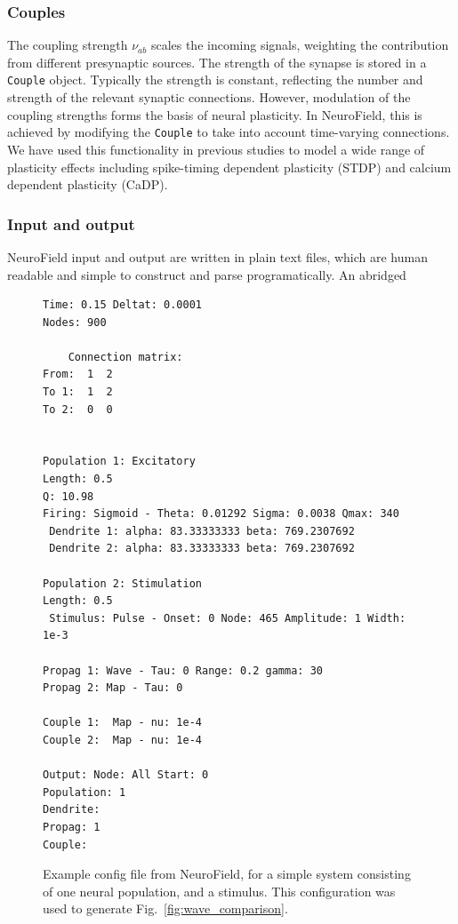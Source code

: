 \documentclass[preprint,review,10pt,authoryear,letterpaper]{elsarticle}
\begin{document}
\subsubsection{Couples}
The coupling strength $\nu_{ab}$ scales the incoming signals, weighting the contribution from different presynaptic sources. The strength of the synapse is stored in a \texttt{Couple} object. Typically the strength is constant, reflecting the number and strength of the relevant synaptic connections. However, modulation of the coupling strengths forms the basis of neural plasticity. In NeuroField, this is achieved by modifying the \texttt{Couple} to take into account time-varying connections. We have used this functionality in previous studies to model a wide range of plasticity effects including spike-timing dependent plasticity (STDP) and calcium dependent plasticity (CaDP). 


\subsubsection{Input and output}
NeuroField input and output are written in plain text files, which are human readable and simple to construct and parse programatically. An abridged 


\begin{figure}[!b]
\begin{center}
\begin{lstlisting}
Time: 0.15 Deltat: 0.0001
Nodes: 900

    Connection matrix:
From:  1  2 
To 1:  1  2  
To 2:  0  0  


Population 1: Excitatory
Length: 0.5
Q: 10.98
Firing: Sigmoid - Theta: 0.01292 Sigma: 0.0038 Qmax: 340
 Dendrite 1: alpha: 83.33333333 beta: 769.2307692
 Dendrite 2: alpha: 83.33333333 beta: 769.2307692

Population 2: Stimulation
Length: 0.5
 Stimulus: Pulse - Onset: 0 Node: 465 Amplitude: 1 Width: 1e-3 

Propag 1: Wave - Tau: 0 Range: 0.2 gamma: 30
Propag 2: Map - Tau: 0

Couple 1:  Map - nu: 1e-4
Couple 2:  Map - nu: 1e-4

Output: Node: All Start: 0 
Population: 1
Dendrite:  
Propag: 1
Couple:  
\end{lstlisting}
\caption{Example config file from NeuroField, for a simple system consisting of one neural population, and a stimulus. This configuration was used to generate Fig.~\ref{fig:wave_comparison}.}
\label{fig:eirs_cycle}
\end{center}
\end{figure}
\end{document}

